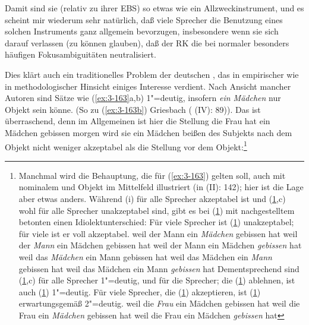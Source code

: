 \documentclass[output=paper]{langsci/langscibook}
\begin{document}
Damit sind sie (relativ zu ihrer EBS) so etwas wie ein
Allzweckinstrument, und es scheint mir wiederum sehr natürlich, daß
viele Sprecher die Benutzung eines solchen Instruments ganz allgemein
bevorzugen, insbesondere wenn sie sich darauf verlassen (zu können
glauben), daß der RK die bei normaler  besonders häufigen
Fokusambiguitäten neutralisiert.

Dies klärt auch ein traditionelles Problem der deutschen ,
das in empirischer wie in methodologischer Hinsicht einiges Interesse
verdient. Nach Ansicht mancher Autoren sind Sätze wie (\ref{ex:3-163}a,b)
1"=deutig, insofern \textit{ein Mädchen} nur Objekt sein könne. (So zu
(\ref{ex:3-163b}) \zb Griesbach (\citeyear{Griesbach1961a} (IV): 89)). Das ist überraschend,
denn im Allgemeinen ist hier die Stellung
\eal
\label{ex:3-163}
\ex
\label{ex:3-163a}
die Frau hat ein Mädchen gebissen
\ex
\label{ex:3-163b}
morgen wird sie ein Mädchen beißen
\zl
des Subjekts nach dem Objekt nicht weniger akzeptabel als die Stellung vor dem
Objekt:\footnote{\label{fn:3-29}%
  Manchmal wird die Behauptung, die für (\ref{ex:3-163}) gelten soll, auch mit
  nominalem  und Objekt im Mittelfeld illustriert (\zb in \citealt{Griesbach1960a} (II): 142); hier ist die Lage aber etwas
  anders. Während (i) für alle Sprecher akzeptabel ist und (\ref{ex:3-fn29iia},c)
  wohl für alle Sprecher unakzeptabel sind, gibt es bei (\ref{ex:3-fn29iib}) mit
  nachgestelltem betonten  einen Idiolektunterschied: Für viele
  Sprecher ist (\ref{ex:3-fn29iib}) unakzeptabel; für viele ist er voll akzeptabel.
  \eal
  \label{ex:3-fn29i}
  \ex
  \label{ex:3-fn29ia}
  weil der Mann ein \textit{Mädchen} gebissen hat
  \ex
  \label{ex:3-fn29ib}
  weil der \textit{Mann} ein Mädchen gebissen hat
  \ex
  \label{ex:3-fn29ic}
  weil der Mann ein Mädchen \textit{gebissen} hat
  \zlmid
  \eal
  \label{ex:3-fn29ii}
  \ex
  \label{ex:3-fn29iia}
  weil das \textit{Mädchen} ein Mann gebissen hat
  \ex
  \label{ex:3-fn29iib}
  weil das Mädchen ein \textit{Mann} gebissen hat
  \ex
  \label{ex:3-fn29iic}
  weil das Mädchen ein Mann \textit{gebissen} hat
  \zl
  Dementsprechend sind (\ref{ex:3-fn29iiia},c) für alle Sprecher 1"=deutig, und für
  die Sprecher; die (\ref{ex:3-fn29iib}) ablehnen, ist auch (\ref{ex:3-fn29iiib}) 1"=deutig. Für
  viele Sprecher, die (\ref{ex:3-fn29iib}) akzeptieren, ist (\ref{ex:3-fn29iiib}) erwartungsgemäß
  2"=deutig.
  \eal
  \label{ex:3-fn29iii}
  \ex
  \label{ex:3-fn29iiia}
  weil die \textit{Frau} ein Mädchen gebissen hat
  \ex
  \label{ex:3-fn29iiib}
  weil die Frau ein \textit{Mädchen} gebissen hat
  \ex
  \label{ex:3-fn29iiic}
  weil die Frau ein Mädchen \textit{gebissen} hat
  \zllast%
}
\end{document}
